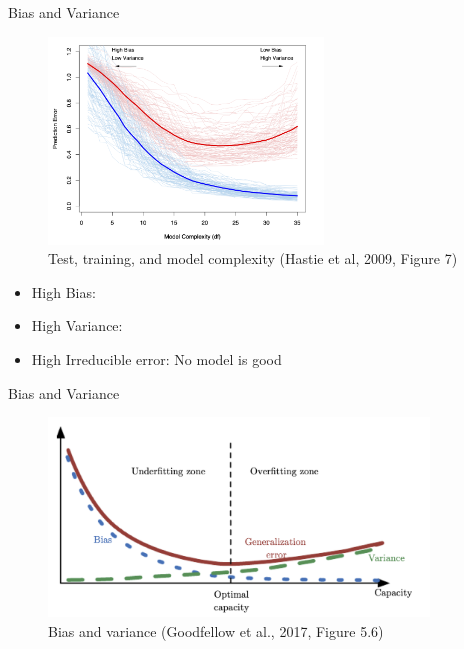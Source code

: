 \documentclass[10pt]{beamer}
\begin{document}
\begin{frame}{Bias and Variance}

\begin{figure}[h]
\caption{Test, training, and model complexity (Hastie et al, 2009, Figure 7)}
\centering
\includegraphics[width=0.65\textwidth]{figs/ESL_7_1.png}
\end{figure}

\begin{itemize}
\item High Bias: 
\item High Variance: 
\item High Irreducible error: No model is good
\end{itemize}

\end{frame}


\begin{frame}{Bias and Variance}

\begin{figure}[h]
\caption{Bias and variance (Goodfellow et al., 2017, Figure 5.6)}
\centering
\includegraphics[width=0.9\textwidth]{figs/Dl_5_6.png}
\end{figure}

\end{frame}
\end{document}
